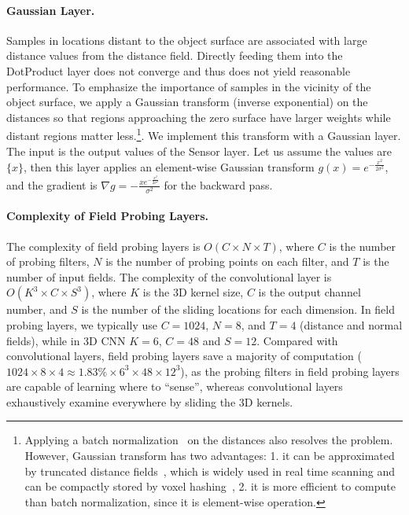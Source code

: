 \documentclass{article}
\begin{document}
\paragraph{Gaussian Layer.} Samples in locations distant to the object surface are associated with large distance values from the distance field. Directly feeding them into the DotProduct layer does not converge and thus does not yield reasonable performance. To emphasize the importance of samples in the vicinity of the object surface, we apply a Gaussian transform (inverse exponential) on the distances so that regions approaching the zero surface have larger weights while distant regions matter less.\footnote{Applying a batch normalization~\cite{ioffe2015batch} on the distances also resolves the problem. However, Gaussian transform has two advantages: 1. it can be approximated by truncated distance fields~\cite{Curless_SIGGRAPH96_A}, which is widely used in real time scanning and can be compactly stored by voxel hashing~\cite{Niessner_ToG13_Real}, 2. it is more efficient to compute than batch normalization, since it is element-wise operation.}. We implement this transform with a Gaussian layer. The input is the output values of the Sensor layer. Let us assume the values are $\{x\}$, then this layer applies an element-wise Gaussian transform $g(x) = e^{-\frac{x^2}{2 {\sigma}^2}}$, and the gradient is $\nabla g = -\frac{x e^{-\frac{x^2}{2 {\sigma}^2}}}{{\sigma}^2}$ for the backward pass.





\paragraph{Complexity of Field Probing Layers.} The complexity of field probing layers is $O(C \times N \times T)$, where $C$ is the number of probing filters, $N$ is the number of probing points on each filter, and $T$ is the number of input fields. The complexity of the convolutional layer is $O(K^3 \times C \times S^3)$, where $K$ is the 3D kernel size, $C$ is the output channel number, and $S$ is the number of the sliding locations for each dimension. In field probing layers, we typically use $C = 1024$, $N = 8$, and $T=4$ (distance and normal fields), while in 3D CNN $K=6$, $C = 48$ and $S=12$. Compared with convolutional layers, field probing layers save a majority of computation ($1024 \times 8 \times 4 \approx 1.83\% \times 6^3 \times 48 \times 12^3$), as the probing filters in field probing layers are capable of learning where to ``sense'', whereas convolutional layers exhaustively examine everywhere by sliding the 3D kernels.
\end{document}
